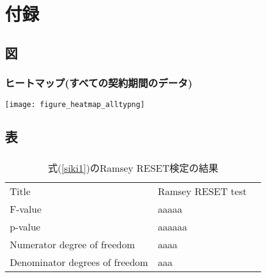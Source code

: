 \documentclass[tyty/main]{subfiles}
\begin{document}
    \section*{付録}
    \setcounter{subsection}{0} %
    \renewcommand{\thesubsection}{\Alph{subsection}} %
    \setcounter{subsubsection}{0} %
    \renewcommand{\thesubsubsection}{\Alph{subsection}ty\arabic{subsubsection}}
    \setcounter{equation}{0} %
    \renewcommand{\theequation}{\Alph{subsection}ty\arabic{equation}}
    \setcounter{figure}{0} %
    \renewcommand{\thefigure}{\Alph{subsection}ty\arabic{figure}}
    \setcounter{table}{0} %
    \renewcommand{\thetable}{\Alph{subsection}ty\arabic{table}}

  
\subsection{図}
\subsubsection{ヒートマップ(すべての契約期間のデータ)}
\label{heatmap_all}
\texttt{[image: figure\_heatmap\_alltypng]}\\

\clearpage

\subsection{表}

\subsubsection{   }
  \begin{table}[!htbp] \centering 
    \caption{式(\ref{siki1})のRamsey RESET検定の結果} 
    \label{hyob_spec1_reset} 
      \begin{tabular}{lll}
        Title                          &       Ramsey RESET test \\
        F-value                        &         aaaaa \\
        p-value                        &  aaaaaa \\
        Numerator degree of freedom    &                     aaaa \\
        Denominator degrees of freedom &                   aaa \\
        \end{tabular}
  \end{table} 
  
\end{document}
